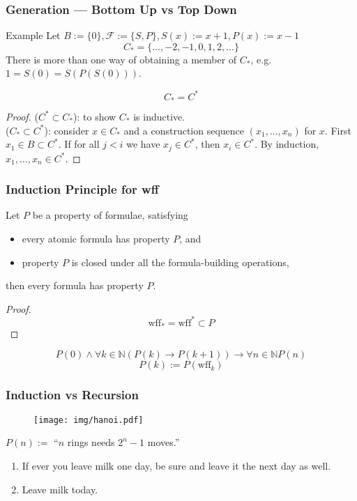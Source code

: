 \documentclass[UTF8,aspectratio=43,11pt,colorlinks,compress,openany]{beamer}%
\begin{document}
\begin{frame}\frametitle{Generation --- Bottom Up vs Top Down}
\setlength\abovedisplayskip{0pt}
\setlength\belowdisplayskip{0pt}
\begin{block}{Example}
		Let $B:=\{0\}, \mathcal{F}:=\{S,P\}, S(x):=x+1, P(x):=x-1$
		\[C_*=\{\dots,-2,-1,0,1,2,\dots\}\]
		There is more than one way of obtaining a member of $C_*$, e.g. $1=S(0)=S(P(S(0)))$.
\end{block}
\begin{theorem}
	\[C_*=C^*\]
\end{theorem}
\begin{proof}
	($C^*\subset C_*$): to show $C_*$ is inductive.\\
	($C_*\subset C^*$): consider $x\in C_*$ and a construction sequence $(x_1,\dots,x_n)$ for $x$. First $x_1\in B\subset C^*$. If for all $j<i$ we have $x_j\in C^*$, then $x_i\in C^*$. By induction, $x_1,\dots,x_n\in C^*$.
\end{proof}
\end{frame}

\begin{frame}\frametitle{Induction Principle for wff}
	\begin{theorem}
		Let $P$ be a property of formulae, satisfying
		\begin{itemize}
		\item every atomic formula has property $P$, and
		\item property $P$ is closed under all the formula-building operations,
		\end{itemize}
		then every formula has property $P$.
	\end{theorem}
	\begin{proof}
		\[\mathrm{wff}_*=\mathrm{wff}^*\subset P\]
	\end{proof}
	\[P(0)\wedge\forall k\in\mathbb{N}(P(k)\to P(k+1))\to\forall n\in\mathbb{N} P(n)\]
	\[P(k):=P(\mathrm{wff}_k)\]
\end{frame}

\begin{frame}\frametitle{Induction vs Recursion}
\begin{figure}[H]
\texttt{[image: img/hanoi.pdf]}
\end{figure}
\begin{center}
$P(n):=$ ``$n$ rings needs $2^n-1$ moves.''
\end{center}
\begin{block}{}
\begin{enumerate}
\item If ever you leave milk one day, be sure and leave it the next day as well.
\item Leave milk today.
\end{enumerate}
\end{block}
\centering
{}
\end{frame}
\end{document}
